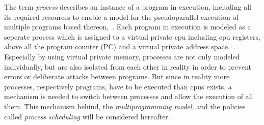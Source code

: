 %
%
%


The term \textit{process} describes an instance of a program in execution, including all its required resources to enable a model for the pseudoparallel execution of multiple programs based thereon\cite{silberschatz2009operating},~\cite{tanenbaum-modern-operating-systems}.
Each program in execution is modeled as a seperate process which is assigned to a virtual private \ac{cpu} including \ac{cpu} registers, above all the program counter (PC) and a virtual private address space\cite{tanenbaum-modern-operating-systems}.~\cite{glatz2015betriebssysteme}.
Especially by using virtual private memory, processes are not only modeled individually, but are also isolated from each other in reality in order to prevent errors or deliberate attacks between programs\cite{brause2017betriebssysteme}.
But since in reality more processes, respectively programs, have to be executed than \acp{cpu} exists, a mechanism is needed to switch between processes and allow the execution of all them.
This mechanism behind, the \textit{multiprogramming model}, and the policies called \textit{process scheduling} will be considered hereafter.

